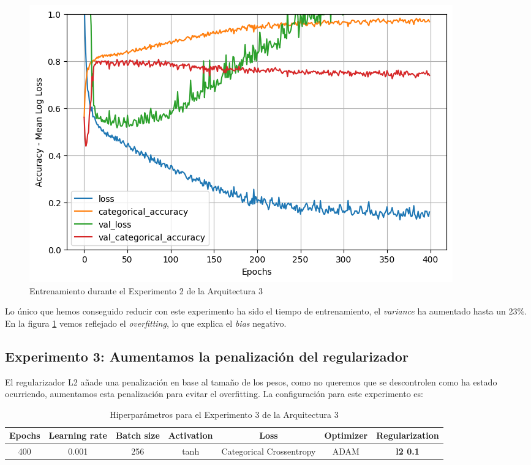\documentclass{article}
\begin{document}
			\begin{figure}[!h]
				\begin{center}
					\includegraphics[scale=0.4]{d-tr-a3-e2.png}		
					\caption{Entrenamiento durante el Experimento 2 de la Arquitectura 3}	
					\label{d-tr-a3-e2}
				\end{center}
			\end{figure}
			Lo \'unico que hemos conseguido reducir con este experimento ha sido el tiempo de entrenamiento, el \textit{variance} ha aumentado hasta un 23\%.
			En la figura \ref{d-tr-a3-e2} vemos reflejado el \textit{overfitting}, lo que explica el \textit{bias} negativo.
			
		\subsection{Experimento 3: Aumentamos la penalizaci\'on del regularizador}
		\label{d-s-a3-e3}
			El regularizador L2 a\~nade una penalizaci\'on en base al tama\~no de los pesos, como no queremos que se descontrolen como ha estado ocurriendo, aumentamos esta penalizaci\'on para evitar el overfitting. La configuraci\'on para este experimento es:
			\begin{table}[!h]
				\begin{tabular}{| c | c | c | c | c | c | c |}
					\textbf{Epochs} & \textbf{Learning rate} & \textbf{Batch size} & \textbf{Activation} & \textbf{Loss} & \textbf{Optimizer} & \textbf{Regularization} \\ \hline
					400 & 0.001 & 256 & tanh & Categorical Crossentropy & ADAM & \textbf{l2 0.1}
				\end{tabular}
				\caption{Hiperpar\'ametros para el Experimento 3 de la Arquitectura 3}
				\label{tab:hip-d-a3-e3}
			\end{table}
			
\end{document}
